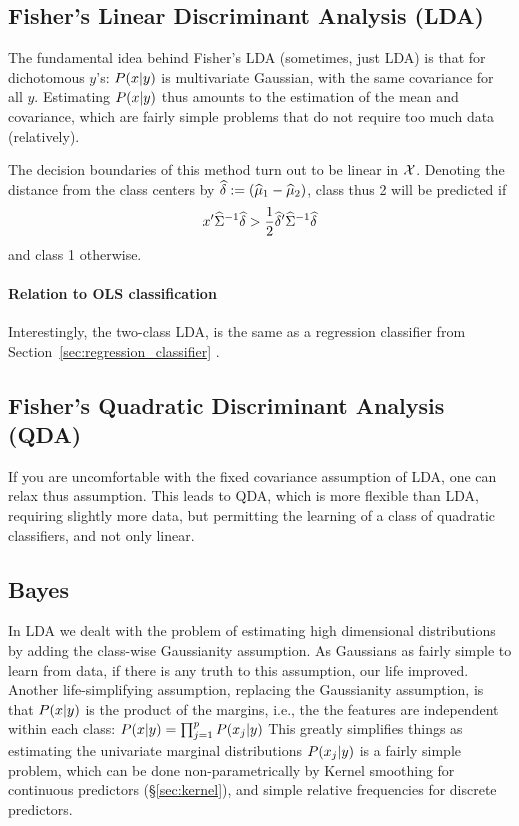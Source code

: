 \subsection{Fisher's Linear Discriminant Analysis (LDA)}
\label{sec:lda}

The fundamental idea behind Fisher's LDA (sometimes, just LDA) is that for dichotomous $y$'s: $P(x|y)$ is multivariate Gaussian, with the same covariance for all $y$.
Estimating $P(x|y)$ thus amounts to the estimation of the mean and covariance, which are fairly simple problems that do not require too much data (relatively).

The decision boundaries of this method turn out to be linear in $\mathcal{X}$. 
Denoting the distance from the class centers by $\widehat{\delta}:=(\widehat{\mu}_1-\widehat{\mu}_2)$, class thus 2 will be predicted if 
\begin{align}
	x' \widehat{\Sigma}^{-1} \widehat{\delta} > \frac{1}{2} \widehat{\delta}' \widehat{\Sigma}^{-1} \widehat{\delta}
\end{align}
and class 1 otherwise.


\paragraph{Relation to OLS classification}
Interestingly, the two-class LDA, is the same as a regression classifier from  Section~\ref{sec:regression_classifier} \cite[Eq. 4.11 ]{hastie_elements_2003}.



\subsection{Fisher's Quadratic Discriminant Analysis (QDA)}
\label{sec:qda}
If you are uncomfortable with the fixed covariance assumption of LDA, one can relax thus assumption.
This leads to QDA, which is more flexible than LDA, requiring slightly more data, but permitting the learning of a class of quadratic classifiers, and not only linear.






\subsection{\Naive Bayes}
\label{sec:naive_bayes}

In LDA we dealt with the problem of estimating high dimensional distributions by adding the class-wise Gaussianity assumption. As Gaussians as fairly simple to learn from data, if there is any truth to this assumption, our life improved. 
Another life-simplifying assumption, replacing the Gaussianity assumption, is that $P(x|y)$ is the product of the margins, i.e., the the features are independent within each class: $P(x|y)=\prod_{j=1}^pP(x_j|y)$
This greatly simplifies things as estimating the univariate marginal distributions $P(x_j|y)$ is a fairly simple problem, which can be done non-parametrically by Kernel smoothing for continuous predictors (\S\ref{sec:kernel}), and simple relative frequencies for discrete predictors. 





